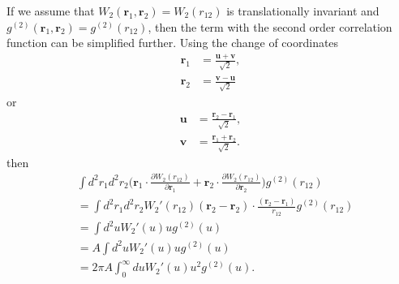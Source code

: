 \documentclass[twocolumn,amsmath,amssymb,aps]{revtex4-1}%
\begin{document}
If we assume that $W_2(\bm{r}_1,\bm{r}_2)=W_2(r_{12})$ is translationally
invariant and $g^{(2)}(\bm{r}_1,\bm{r}_2)=g^{(2)}(r_{12})$, then the term
with the second order correlation function can be simplified further.
Using the change of coordinates
\begin{align}
  \bm{r}_1&=\frac{\bm{u}+\bm{v}}{\sqrt{2}},\\
  \bm{r}_2&=\frac{\bm{v}-\bm{u}}{\sqrt{2}}
\end{align}
or
\begin{align}
  \bm{u}&=\frac{\bm{r}_2-\bm{r}_1}{\sqrt{2}},\\
  \bm{v}&=\frac{\bm{r}_1+\bm{r}_2}{\sqrt{2}}.
\end{align}
then
\begin{align}
  &\int d^2r_1d^2r_2\bigg(\bm{r}_1\cdot
  \frac{\partial W_2(r_{12})}{\partial \bm{r}_1}
  +\bm{r}_2\cdot
  \frac{\partial W_2(r_{12})}{\partial \bm{r}_2}\bigg)
  g^{(2)}(r_{12})\nonumber\\
  &=\int d^2r_1d^2r_2
  W_2'(r_{12})(\bm{r}_2-\bm{r}_2)\cdot
  \frac{(\bm{r}_2-\bm{r}_1)}{r_{12}}
  g^{(2)}(r_{12})\nonumber\\
  &=\int d^2u W_2'(u)u g^{(2)}(u)\nonumber\\
  &=A\int d^2u W_2'(u)u g^{(2)}(u)\nonumber\\
  &=2\pi A\int_0^{\infty} du W_2'(u)u^2 g^{(2)}(u).
\end{align}
\end{document}

